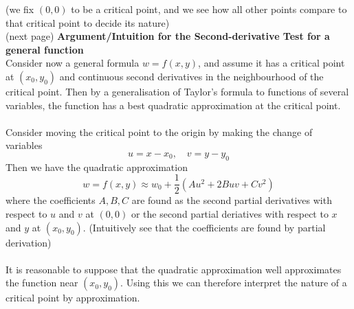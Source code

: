 \documentclass{report}
\begin{document}
(we fix $(0,0)$ to be a critical point, and we see how all other points compare to that critical point to decide
its nature)\\
(next page)
\newpage
\noindent\textbf{Argument/Intuition for the Second-derivative Test for a general function}\\
Consider now a general formula $w=f(x,y)$, and assume it has a critical point at $(x_0,y_0)$ and continuous second
derivatives in the neighbourhood of the critical point.
Then by a generalisation of Taylor's formula to functions
of several variables, the function has a best quadratic approximation at the critical point.\\
\vspace{1mm}\\
Consider moving the critical point to the origin by making the change of variables
\begin{equation*}
u=x-x_0,\quad v=y-y_0
\end{equation*}
Then we have the quadratic approximation
\begin{equation*}
w=f(x,y)\approx w_0+\frac{1}{2}(Au^2+2Buv+Cv^2)
\end{equation*}
where the coefficients $A,B,C$ are found as the second partial derivatives with respect to $u$ and $v$ at $(0,0)$ or
the second partial deriatives with respect to $x$ and $y$ at $(x_0,y_0)$.
(Intuitively see that the coefficients are found by partial derivation)\\
\vspace{1mm}\\
It is reasonable to suppose that the quadratic approximation well approximates the function near $(x_0,y_0)$. 
Using this we can therefore interpret the nature of a critical point by approximation.
\newpage
\end{document}
